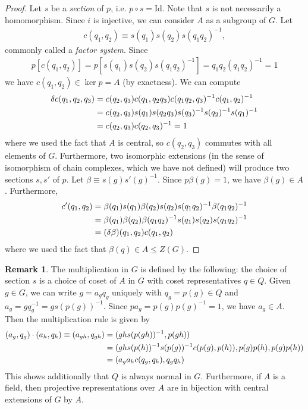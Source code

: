 \documentclass{article}
\theoremstyle{definition}
\theoremstyle{definition}
\newtheorem{rmk}{Remark}
\newcommand{\Id}{\text{Id}}
\begin{document}
\begin{proof}
Let $s$ be a \textit{section} of $p$, i.e. $p \circ s = \Id$. 
Note that $s$ is not necessarily a homomorphism.
Since $i$ is injective, we can consider $A$ as a subgroup of $G$. Let 
\begin{align}
c(q_1, q_2)\equiv 
s(q_1)s(q_2)s(q_1q_2)^{-1} ,
\end{align}
commonly called a \textit{factor system}.
Since
\begin{align}
p[c(q_1, q_2)] = p[s(q_1)s(q_2)s(q_1q_2)^{-1}] = q_1q_2(q_1q_2)^{-1} = 1
\end{align}
we have $c(q_1, q_2) \in \ker p = A$ (by exactness). We can compute
\begin{align}
\delta c(q_1, q_2, q_3) &= c(q_2, q_3)c(q_1, q_2q_3) c(q_1q_2, q_3)^{-1}c(q_1, q_2)^{-1} \notag \\
&= c(q_2,q_3)s(q_1)s(q_2q_3)s(q_3)^{-1}s(q_2)^{-1}s(q_1)^{-1} \notag \\
&= c(q_2,q_3)c(q_2, q_3)^{-1} = 1 \notag \\
\end{align}
where we used the fact that $A$ is central, so $c(q_2, q_3)$ commutes with all elements of $G$. Furthermore, two isomorphic extensions (in the sense of isomorphism of chain complexes, which we have not defined) will produce two sections $s, s'$ of $p$. Let $\beta \equiv s(g)s'(g)^{-1}$. Since $p \beta(g) = 1$, we have $\beta(g) \in A$. Furthermore,
\begin{align}
c'(q_1, q_2) &= \beta(q_1)s(q_1)\beta(q_2)s(q_2)s(q_1q_2)^{-1}\beta(q_1q_2)^{-1} \notag \\ 
&=\beta(q_1)\beta(q_2)\beta(q_1q_2)^{-1}s(q_1)s(q_2)s(q_1q_2)^{-1} \notag \\
&= (\delta \beta)(q_1, q_2)c(q_1, q_2)
\end{align}
where we used the fact that $\beta(q) \in A \leq Z(G)$. 
\end{proof}

\begin{rmk}\label{rmk:extension-multiplication-rule}
The multiplication in $G$ is defined by the following: the choice of section $s$ is a choice of coset of $A$ in $G$ with coset representatives $q \in Q$. 
Given $g \in G$, we can write $g = a_gq_g$ uniquely with $q_g = p(g) \in Q$ and $a_g = gq_g^{-1} = gs(p(g))^{-1}$. Since $p a_g = p(g)p(g)^{-1} = 1$, we have $a_g \in A$.
Then the multiplication rule is given by
\begin{align}
(a_g, q_g)\cdot (a_h, q_h) \equiv  (a_{gh}, q_{gh}) &= (gh s(p(gh))^{-1}, p(gh)) \notag\\
&= (gh s(p(h))^{-1}s(p(g))^{-1}c(p(g), p(h)), p(g)p(h), p(g)p(h)) \notag \\
&= (a_ga_hc(q_g, q_h), q_gq_h)
\end{align}
This shows additionally that $Q$ is always normal in $G$. Furthermore, if $A$ is a field, then projective representations over $A$ are in bijection with central extensions of $G$ by $A$.
\end{rmk}
\end{document}

